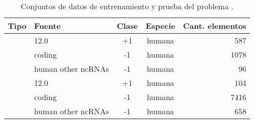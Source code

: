 %
\begin{table}[h]
  \tableStyle
  \begin{tabular}{llScr}
    \toprule
     Tipo & Fuente & {Clase} & Especie & Cant. elementos \\
    \midrule
    &  \mirbase{} 12.0    & +1    & humana    & 587              \\
    &  coding             & -1    & humana    & 1078             \\
    &  human other ncRNAs & -1    & humana    & 96               \\
    \midrule
    &  \mirbase{} 12.0    & +1    & humana    & 104              \\
    &  coding             & -1    & humana    & 7416             \\
    &  human other ncRNAs & -1    & humana    & 658              \\
    \bottomrule
  \end{tabular}
  \caption{\captionStyle Conjuntos de datos de entrenamiento y prueba
    del problema .}
  \label{tbl:problembtw}
\end{table}
%
